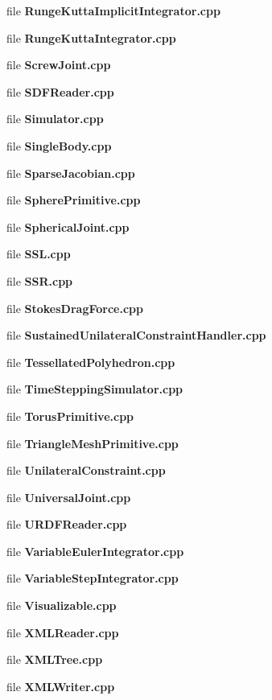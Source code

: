 \begin{DoxyCompactItemize}
file {\bfseries Runge\-Kutta\-Implicit\-Integrator.\-cpp}
\item 
file {\bfseries Runge\-Kutta\-Integrator.\-cpp}
\item 
file {\bfseries Screw\-Joint.\-cpp}
\item 
file {\bfseries S\-D\-F\-Reader.\-cpp}
\item 
file {\bfseries Simulator.\-cpp}
\item 
file {\bfseries Single\-Body.\-cpp}
\item 
file {\bfseries Sparse\-Jacobian.\-cpp}
\item 
file {\bfseries Sphere\-Primitive.\-cpp}
\item 
file {\bfseries Spherical\-Joint.\-cpp}
\item 
file {\bfseries S\-S\-L.\-cpp}
\item 
file {\bfseries S\-S\-R.\-cpp}
\item 
file {\bfseries Stokes\-Drag\-Force.\-cpp}
\item 
file {\bfseries Sustained\-Unilateral\-Constraint\-Handler.\-cpp}
\item 
file {\bfseries Tessellated\-Polyhedron.\-cpp}
\item 
file {\bfseries Time\-Stepping\-Simulator.\-cpp}
\item 
file {\bfseries Torus\-Primitive.\-cpp}
\item 
file {\bfseries Triangle\-Mesh\-Primitive.\-cpp}
\item 
file {\bfseries Unilateral\-Constraint.\-cpp}
\item 
file {\bfseries Universal\-Joint.\-cpp}
\item 
file {\bfseries U\-R\-D\-F\-Reader.\-cpp}
\item 
file {\bfseries Variable\-Euler\-Integrator.\-cpp}
\item 
file {\bfseries Variable\-Step\-Integrator.\-cpp}
\item 
file {\bfseries Visualizable.\-cpp}
\item 
file {\bfseries X\-M\-L\-Reader.\-cpp}
\item 
file {\bfseries X\-M\-L\-Tree.\-cpp}
\item 
file {\bfseries X\-M\-L\-Writer.\-cpp}
\end{DoxyCompactItemize}

